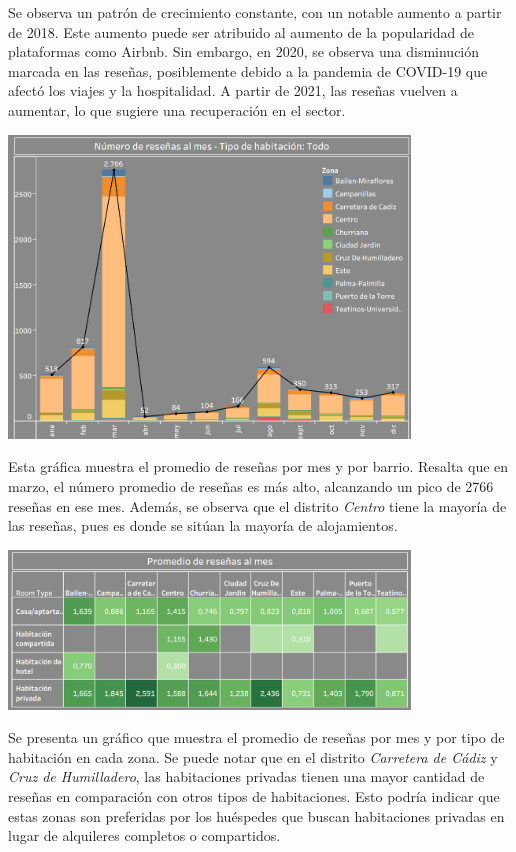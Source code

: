 Se observa un patrón de crecimiento constante, con un notable aumento a partir de 2018. Este aumento puede ser atribuido al aumento de la popularidad de plataformas como Airbnb. Sin embargo, en 2020, se observa una disminución marcada en las reseñas, posiblemente debido a la pandemia de COVID-19 que afectó los viajes y la hospitalidad. A partir de 2021, las reseñas vuelven a aumentar, lo que sugiere una recuperación en el sector.
\begin{center}
    \centering
    \includegraphics[width=0.8\textwidth]{capturas/22.png}
\end{center}
Esta gráfica muestra el promedio de reseñas por mes y por barrio. Resalta que en marzo, el número promedio de reseñas es más alto, alcanzando un pico de 2766 reseñas en ese mes. Además, se observa que el distrito \textit{Centro} tiene la mayoría de las reseñas, pues es donde se sitúan la mayoría de alojamientos.
\begin{center}
    \centering
    \includegraphics[width=0.8\textwidth]{capturas/24.png}
\end{center}
Se presenta un gráfico que muestra el promedio de reseñas por mes y por tipo de habitación en cada zona. Se puede notar que en el distrito \textit{Carretera de Cádiz} y \textit{Cruz de Humilladero}, las habitaciones privadas tienen una mayor cantidad de reseñas en comparación con otros tipos de habitaciones. Esto podría indicar que estas zonas son preferidas por los huéspedes que buscan habitaciones privadas en lugar de alquileres completos o compartidos.

